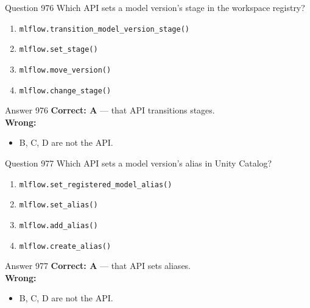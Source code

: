 \documentclass[aspectratio=169,11pt]{beamer}
\begin{document}
	\begin{frame}{Question 976}
		Which API sets a model version's stage in the workspace registry?
		\begin{enumerate}[label=\Alph*.]
			\item \texttt{mlflow.transition\_model\_version\_stage()}
			\item \texttt{mlflow.set\_stage()}
			\item \texttt{mlflow.move\_version()}
			\item \texttt{mlflow.change\_stage()}
		\end{enumerate}
	\end{frame}
	\begin{frame}{Answer 976}
		\textbf{Correct: A} --- that API transitions stages.\\
		\vspace{0.5em}
		\textbf{Wrong:}
		\begin{itemize}
			\item B, C, D are not the API.
		\end{itemize}
	\end{frame}
	
	\begin{frame}{Question 977}
		Which API sets a model version's alias in Unity Catalog?
		\begin{enumerate}[label=\Alph*.]
			\item \texttt{mlflow.set\_registered\_model\_alias()}
			\item \texttt{mlflow.set\_alias()}
			\item \texttt{mlflow.add\_alias()}
			\item \texttt{mlflow.create\_alias()}
		\end{enumerate}
	\end{frame}
	\begin{frame}{Answer 977}
		\textbf{Correct: A} --- that API sets aliases.\\
		\vspace{0.5em}
		\textbf{Wrong:}
		\begin{itemize}
			\item B, C, D are not the API.
		\end{itemize}
	\end{frame}
	
\end{document}
